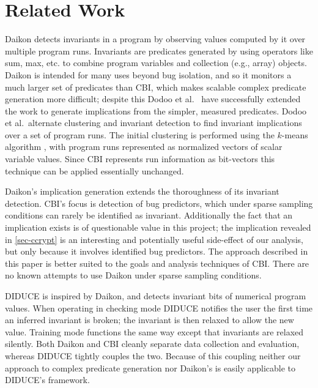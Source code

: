 
\section{Related Work}
\label{sec-related-work}
Daikon \cite{ErnstPGMPTX2006} detects invariants in a program by observing values computed by it over multiple program runs.  Invariants are predicates generated by using operators like sum, max, etc. to combine program variables and collection (e.g., array) objects.  Daikon is intended for many uses beyond bug isolation, and so it monitors a much larger set of predicates than CBI, which makes scalable complex predicate generation more difficult; despite this Dodoo et al.\ \cite{ErnstDRAFT} have successfully extended the work to generate implications from the simpler, measured predicates.  Dodoo et al.\ alternate clustering and invariant detection to find invariant implications over a set of program runs.  The initial clustering is performed using the $k$-means algorithm \cite{jain99data}, with program runs represented as normalized vectors of scalar variable values.  Since CBI represents run information as bit-vectors this technique can be applied essentially unchanged.

Daikon's implication generation extends the thoroughness of its invariant detection.  CBI's focus is detection of bug predictors, which under sparse sampling conditions can rarely be identified as invariant.  Additionally the fact that an implication exists is of questionable value in this project; the implication revealed in \autoref{sec-ccrypt} is an interesting and potentially useful side-effect of our analysis, but only because it involves identified bug predictors.  The approach described in this paper is better suited to the goals and analysis techniques of CBI.  There are no known attempts to use Daikon under sparse sampling conditions.

DIDUCE \cite{581377} is inspired by Daikon, and detects invariant bits of numerical program values.  When operating in checking mode DIDUCE notifies the user the first time an inferred invariant is broken; the invariant is then relaxed to allow the new value.  Training mode functions the same way except that invariants are relaxed silently.  Both Daikon and CBI cleanly separate data collection and evaluation, whereas DIDUCE tightly couples the two.  Because of this coupling neither our approach to complex predicate generation nor Daikon's is easily applicable to DIDUCE's framework.

